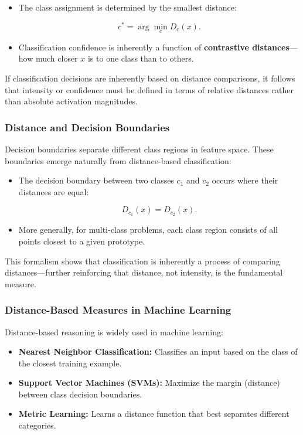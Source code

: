 \documentclass[12pt]{article}
\begin{document}
\begin{itemize}
    \item The class assignment is determined by the smallest distance:
    
    \[
    c^* = \arg\min_{c} D_c(x).
    \]

    \item Classification confidence is inherently a function of \textbf{contrastive distances}—how much closer \( x \) is to one class than to others.

\end{itemize}

If classification decisions are inherently based on distance comparisons, it follows that intensity or confidence must be defined in terms of relative distances rather than absolute activation magnitudes.

\subsubsection{Distance and Decision Boundaries}

Decision boundaries separate different class regions in feature space. These boundaries emerge naturally from distance-based classification:

\begin{itemize}
    \item The decision boundary between two classes \( c_1 \) and \( c_2 \) occurs where their distances are equal:

    \[
    D_{c_1}(x) = D_{c_2}(x).
    \]

    \item More generally, for multi-class problems, each class region consists of all points closest to a given prototype.
\end{itemize}

This formalism shows that classification is inherently a process of comparing distances—further reinforcing that distance, not intensity, is the fundamental measure.

\subsubsection{Distance-Based Measures in Machine Learning}

Distance-based reasoning is widely used in machine learning:

\begin{itemize}
    \item \textbf{Nearest Neighbor Classification:} Classifies an input based on the class of the closest training example.
    \item \textbf{Support Vector Machines (SVMs):} Maximize the margin (distance) between class decision boundaries.
    \item \textbf{Metric Learning:} Learns a distance function that best separates different categories.
\end{itemize}
\end{document}
